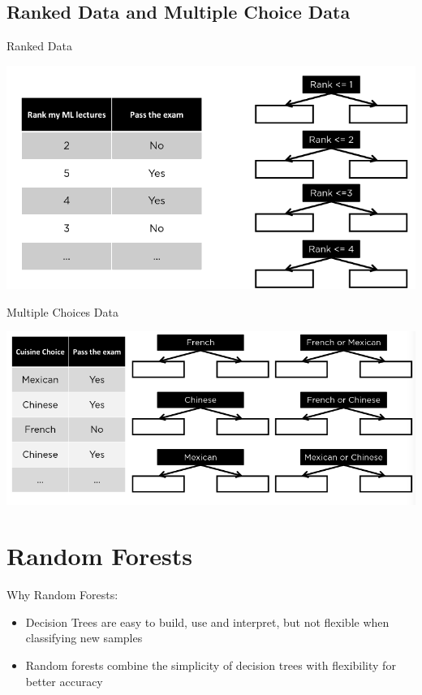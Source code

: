 \documentclass{article}[18pt]
\begin{document}
\subsection{Ranked Data and Multiple Choice Data}
Ranked Data
\begin{center}
	\includegraphics[scale=0.7]{"Ranked Data"}
\end{center}
Multiple Choices Data
\begin{center}
	\includegraphics[scale=0.7]{"Multiple Choices Data"}
\end{center}
\section{Random Forests}
Why Random Forests:
\begin{itemize}
	\item Decision Trees are easy to build, use and interpret, but not flexible when classifying new samples
	\item Random forests combine the simplicity of decision trees with flexibility for better accuracy 
\end{itemize}
\end{document}
